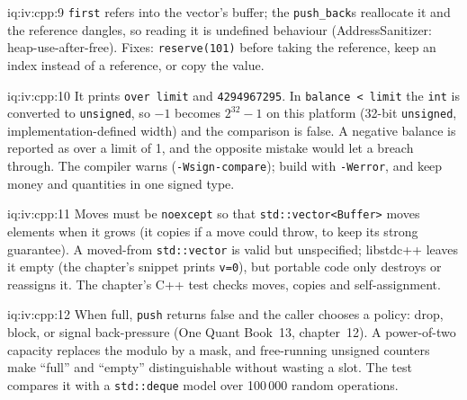\begin{solution}{iq:iv:cpp:9}
\texttt{first} refers into the vector's buffer; the \texttt{push\_back}s reallocate it and the reference dangles, so reading it is
undefined behaviour (AddressSanitizer: heap-use-after-free). Fixes: \texttt{reserve(101)} before taking the reference, keep an index
instead of a reference, or copy the value.
\end{solution}

\begin{solution}{iq:iv:cpp:10}
It prints \texttt{over limit} and \texttt{4294967295}. In \texttt{balance < limit} the \texttt{int} is converted to
\texttt{unsigned}, so $-1$ becomes $2^{32} - 1$ on this platform (32-bit \texttt{unsigned}, implementation-defined width) and the
comparison is false. A negative balance is reported as over a limit of 1, and the opposite mistake would let a breach through.
The compiler warns (\texttt{-Wsign-compare}); build with \texttt{-Werror}, and keep money and quantities in one signed type.
\end{solution}

\begin{solution}{iq:iv:cpp:11}
\label{lst:iv:cpp:buffer}
Moves must be \texttt{noexcept} so that \texttt{std::vector<Buffer>} moves elements when it grows (it copies if a move could throw,
to keep its strong guarantee). A moved-from \texttt{std::vector} is valid but unspecified; libstdc++ leaves it empty (the chapter's
snippet prints \texttt{v=0}), but portable code only destroys or reassigns it. The chapter's C++ test checks moves, copies and
self-assignment.
\end{solution}

\begin{solution}{iq:iv:cpp:12}
\label{lst:iv:cpp:ring}
When full, \texttt{push} returns false and the caller chooses a policy: drop, block, or signal back-pressure (One Quant Book~13,
chapter~12). A power-of-two capacity replaces the modulo by a mask, and free-running unsigned counters make ``full'' and ``empty''
distinguishable without wasting a slot. The test compares it with a \texttt{std::deque} model over 100\,000 random operations.
\end{solution}


